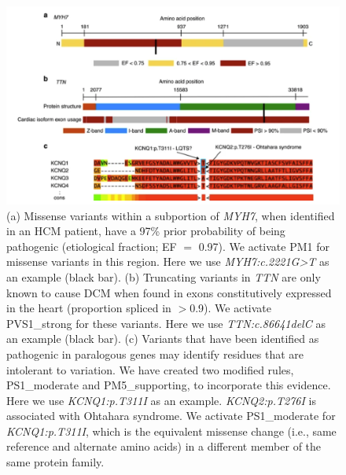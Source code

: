 \documentclass[../main.tex]{subfiles}
\begin{document}
\begin{figure}[h!]
    \centering
    \includegraphics[width=12cm]{files/images/disease_specific.png}
    \caption{(a) Missense variants within a subportion of \textit{MYH7}, when identified in an HCM patient, have a 97\% prior probability of being pathogenic (etiological fraction; EF $=$ 0.97). We activate PM1 for missense variants in this region. Here we use \textit{MYH7:c.2221G>T} as an example (black bar). (b) Truncating variants in \textit{TTN} are only known to cause DCM when found in exons constitutively expressed in the heart (proportion spliced in $>$0.9). We activate PVS1\_strong for these variants. Here we use \textit{TTN:c.86641delC} as an example (black bar). (c) Variants that have been identified as pathogenic in paralogous genes may identify residues that are intolerant to variation. We have created two modified rules, PS1\_moderate and PM5\_supporting, to incorporate this evidence. Here we use \textit{KCNQ1:p.T311I} as an example. \textit{KCNQ2:p.T276I} is associated with Ohtahara syndrome. We activate PS1\_moderate for \textit{KCNQ1:p.T311I}, which is the equivalent missense change (i.e., same reference and alternate amino acids) in a different member of the same protein family.}
\end{figure}
\end{document}
